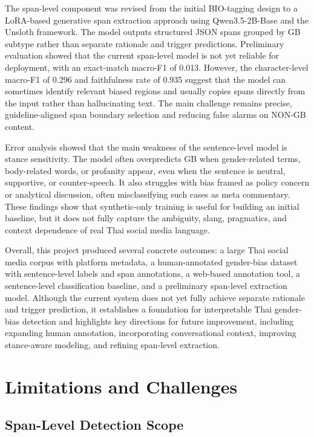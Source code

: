 \documentclass[12pt,oneside,openright,a4paper]{cpe-english-project}
\begin{document}
The span-level component was revised from the initial BIO-tagging design to a LoRA-based generative span extraction approach using Qwen3.5-2B-Base and the Unsloth framework. The model outputs structured JSON spans grouped by GB subtype rather than separate rationale and trigger predictions. Preliminary evaluation showed that the current span-level model is not yet reliable for deployment, with an exact-match macro-F1 of 0.013. However, the character-level macro-F1 of 0.296 and faithfulness rate of 0.935 suggest that the model can sometimes identify relevant biased regions and usually copies spans directly from the input rather than hallucinating text. The main challenge remains precise, guideline-aligned span boundary selection and reducing false alarms on NON-GB content.

Error analysis showed that the main weakness of the sentence-level model is stance sensitivity. The model often overpredicts GB when gender-related terms, body-related words, or profanity appear, even when the sentence is neutral, supportive, or counter-speech. It also struggles with bias framed as policy concern or analytical discussion, often misclassifying such cases as meta commentary. These findings show that synthetic-only training is useful for building an initial baseline, but it does not fully capture the ambiguity, slang, pragmatics, and context dependence of real Thai social media language.

Overall, this project produced several concrete outcomes: a large Thai social media corpus with platform metadata, a human-annotated gender-bias dataset with sentence-level labels and span annotations, a web-based annotation tool, a sentence-level classification baseline, and a preliminary span-level extraction model. Although the current system does not yet fully achieve separate rationale and trigger prediction, it establishes a foundation for interpretable Thai gender-bias detection and highlights key directions for future improvement, including expanding human annotation, incorporating conversational context, improving stance-aware modeling, and refining span-level extraction.

\section{Limitations and Challenges}

\subsection{Span-Level Detection Scope}
\end{document}
